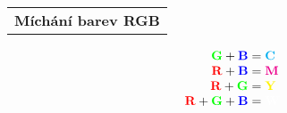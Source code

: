 \documentclass[12pt]{extarticle}
\begin{document}
\pagestyle{empty}
\color{white}
\parindent=0cm
\noindent
\hskip-1.70mm%
\setlength{\tabcolsep}{1.5pt}
\renewcommand*{\arraystretch}{1.037}
\begin{tabularx}{\textwidth}{l}
\textbf{Míchání barev RGB} \\
\end{tabularx}

\vspace{-2.5mm}
\large\noindent
\begin{align*}
{\color{green} \mathbf{G}} + {\color{blue} \mathbf{B}} &= {\color{cyan} \mathbf{C}} \\[-1mm]
{\color{red} \mathbf{R}} + {\color{blue} \mathbf{B}} &= {\color{magenta} \mathbf{M}} \\[-1mm]
{\color{red} \mathbf{R}} + {\color{green} \mathbf{G}} &= {\color{yellow} \mathbf{Y}} \\[-1mm]
{\color{red} \mathbf{R}} + {\color{green} \mathbf{G}} + {\color{blue} \mathbf{B}} &= {\color{white} \mathbf{W}}
\end{align*}
\end{document}
